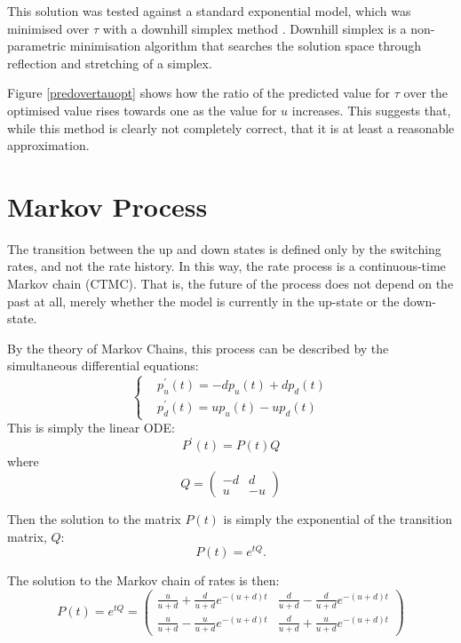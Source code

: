 This solution was tested against a standard exponential model, which was minimised over $\tau$ with a downhill simplex method \citep{NelderMead1965a}.  Downhill simplex is a non-parametric minimisation algorithm that searches the solution space through reflection and stretching of a simplex.

Figure \ref{predovertauopt} shows how the ratio of the predicted value for $\tau$ over the optimised value rises towards one as the value for $u$ increases.  This suggests that, while this method is clearly not completely correct, that it is at least a reasonable approximation.

\section{Markov Process}

The transition between the up and down states is defined only by the switching rates, and not the rate history. In this way, the rate process is a continuous-time Markov chain (CTMC).  That is, the future of the process does not depend on the past at all, merely whether the model is currently in the up-state or the down-state.

By the theory of Markov Chains, this process can be described by the simultaneous differential equations:
\begin{equation}
\left\{
\begin{split} &p_u^{\prime}(t) = -dp_u(t) + dp_d(t)\\ &p_d^{\prime}(t)=up_u(t) - up_d(t)
\end{split}
\right.
\end{equation}
This is simply the linear ODE:
\begin{equation}
P^{\prime}(t) = P(t)Q
\end{equation}
where
\begin{equation}
Q =  \begin{pmatrix} -d & d \\ u & -u \end{pmatrix}
\end{equation}

Then the solution to the matrix $P(t)$ is simply the exponential of the transition matrix, $Q$:
\begin{equation}
P(t) = e^{tQ}.
\end{equation}

The solution to the Markov chain of rates is then:
\begin{equation}
P(t) = e^{tQ} = \begin{pmatrix} \frac{u}{u+d}+\frac{d}{u+d}e^{-(u+d)t} & \frac{d}{u+d} - \frac{d}{u+d}e^{-(u+d)t} \\ \frac{u}{u+d} - \frac{u}{u+d}e^{-(u+d)t} & \frac{d}{u+d} + \frac{u}{u+d}e^{-(u+d)t}\end{pmatrix}
\end{equation}

